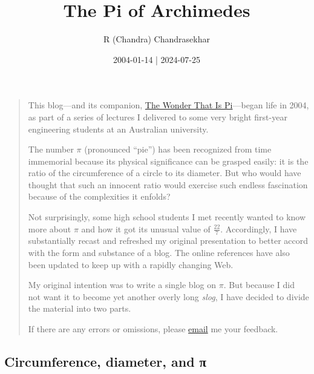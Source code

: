 \documentclass[
  a4paper,
]{article}
\title{The Pi of Archimedes}
\author{R (Chandra) Chandrasekhar}
\date{2004-01-14 | 2024-07-25}
\begin{document}
\maketitle

\thispagestyle{empty}


\begin{quote}
This blog---and its companion,
\href{https://swanlotus.netlify.app/blogs/the-wonder-that-is-pi}{The
Wonder That Is Pi}---began life in 2004, as part of a series of lectures
I delivered to some very bright first-year engineering students at an
Australian university.

The number \(\pi\) (pronounced ``pie'') has been recognized from time
immemorial because its physical significance can be grasped easily: it
is the ratio of the circumference of a circle to its diameter. But who
would have thought that such an innocent ratio would exercise such
endless fascination because of the complexities it enfolds?

Not surprisingly, some high school students I met recently wanted to
know more about \(\pi\) and how it got its unusual value of
\(\frac{22}{7}\). Accordingly, I have substantially recast and refreshed
my original presentation to better accord with the form and substance of
a blog. The online references have also been updated to keep up with a
rapidly changing Web.

My original intention was to write a single blog on \(\pi\). But because
I did not want it to become yet another overly long \emph{slog}, I have
decided to divide the material into two parts.

If there are any errors or omissions, please
\href{mailto:feedback.swanlotus@gmail.com}{email} me your feedback.
\end{quote}

\subsection{Circumference, diameter, and
π}\label{circumference-diameter-and-ux3c0}
\end{document}
